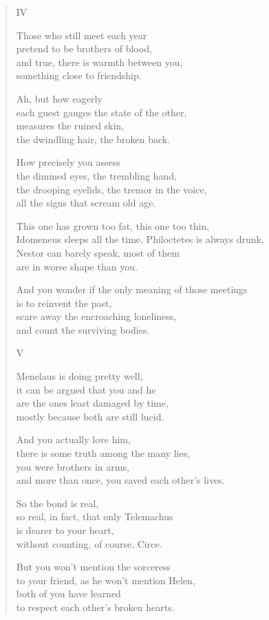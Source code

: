 \documentclass[11pt,a4paper]{article}
\begin{document}
\begin{verse}
IV

Those who still meet each year\\
pretend to be brothers of blood,\\
and true, there is warmth between you,\\
something close to friendship.

Ah, but how eagerly\\
each guest gauges the state of the other,\\
measures the ruined skin,\\
the dwindling hair, the broken back.

How precisely you assess\\
the dimmed eyes, the trembling hand,\\
the drooping eyelids, the tremor in the voice,\\
all the signs that scream old age.

This one has grown too fat, this one too thin,\\
Idomeneus sleeps all the time, Philoctetes is always drunk,\\
Nestor can barely speak, most of them\\
are in worse shape than you.

And you wonder if the only meaning of those meetings\\
is to reinvent the past,\\
scare away the encroaching loneliness,\\
and count the surviving bodies.

V

Menelaus is doing pretty well,\\
it can be argued that you and he\\
are the ones least damaged by time,\\
mostly because both are still lucid.

And you actually love him,\\
there is some truth among the many lies,\\
you were brothers in arms,\\
and more than once, you saved each other's lives.

So the bond is real,\\
so real, in fact, that only Telemachus\\
is dearer to your heart,\\
without counting, of course, Circe.

But you won't mention the sorceress\\
to your friend, as he won't mention Helen,\\
both of you have learned\\
to respect each other's broken hearts.


\end{verse}
\end{document}
